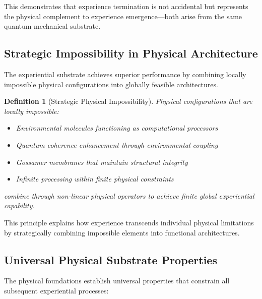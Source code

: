 \documentclass{article}
\newtheorem{definition}[theorem]{Definition}
\begin{document}
This demonstrates that experience termination is not accidental but represents the physical complement to experience emergence—both arise from the same quantum mechanical substrate.

\subsection{Strategic Impossibility in Physical Architecture}

The experiential substrate achieves superior performance by combining locally impossible physical configurations into globally feasible architectures.

\begin{definition}[Strategic Physical Impossibility]
Physical configurations that are locally impossible:
\begin{itemize}
\item Environmental molecules functioning as computational processors
\item Quantum coherence enhancement through environmental coupling
\item Gossamer membranes that maintain structural integrity
\item Infinite processing within finite physical constraints
\end{itemize}
combine through non-linear physical operators to achieve finite global experiential capability.
\end{definition}

This principle explains how experience transcends individual physical limitations by strategically combining impossible elements into functional architectures.

\subsection{Universal Physical Substrate Properties}

The physical foundations establish universal properties that constrain all subsequent experiential processes:
\end{document}
